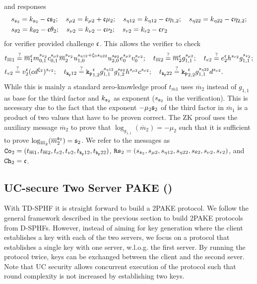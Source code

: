 and responses
\begin{align*}
  & s_{\mathfrak{s}_2} = k_{\mathfrak{s}_2} - \mathfrak{c}\mathfrak{s}_2; ~~~ s_{\mu2} = k_{\mu2} + \mathfrak{c}\mu_2; ~~~ s_{\eta12} = k_{\eta12} - \mathfrak{c}\eta_{1,2}; ~~~ s_{\eta22} = k_{\eta22} - \mathfrak{c}\eta_{2,2}; \\
  & s_{\theta2} = k_{\theta2} - \mathfrak{c}\theta_2; ~~~ s_{\nu2} = k_{\nu2} - \mathfrak{c}\nu_2; ~~~ s_{r2} = k_{r2} - \mathfrak{c} r_2
\end{align*}
for verifier provided challenge $\mathfrak{c}$.
This allows the verifier to check
\begin{align*}
  & t_{\overline{m}1} \stackrel{?}{=} \overline{m}_1^\mathfrak{c} m_{0,1}^{s_{\mathfrak{s}_2}} c_{0,1}^{s_{\mu2}} \overline{m}_{2}^{s_{\mathfrak{s}_2}} u_{1,0}^{s_{\eta12} + \xi_0 s_{\eta22}} u_{2,0}^{s_{\theta2}} e_0^{s_{\mu2}} v_0^{s_{\nu2}}; ~~~ 
    t_{\overline{m}2} \stackrel{?}{=} \overline{m}_2^\mathfrak{c} g_{1,1}^{s_{\mu2}}; ~~~  t_{e2} \stackrel{?}{=} e_2^\mathfrak{c} h^{s_{r2}}g_{1,1}^{s_{\mathfrak{s}_2}}; \\
  & t_{v2} \stackrel{?}{=} v_2^\mathfrak{c} (cd^{\xi_2})^{s_{r2}}; ~~~
    t_{\mathtt{k_p}12} \stackrel{?}{=} \mathtt{k_p}_{1,2}^\mathfrak{c} g_{1,1}^{s_{\eta12}} g_{1,2}^{s_{\theta2}} h^{s_{\mu2}} c^{s_{\nu2}}; ~~~ 
    t_{\mathtt{k_p}22} \stackrel{?}{=} \mathtt{k_p}_{2,2}^\mathfrak{c} g_{1,1}^{s_{\eta22}} d^{s_{\nu2}} .
\end{align*}
While this is mainly a standard zero-knowledge proof $t_{\overline{m}1}$ uses $\overline{m}_2$ instead of $g_{1,1}$ as base for the third factor and $k_{\mathfrak{s}_2}$ as exponent ($s_{\mathfrak{s}_2}$ in the verification).
This is necessary due to the fact that the exponent $-\mu_2 {\mathfrak{s}_2}$ of the third factor in $\overline{m}_1$ is a product of two values that have to be proven correct.
The \ac{ZK} proof uses the auxiliary message $\overline{m}_2$ to prove that $\log_{g_{1,1}}(\overline{m}_2)=-\mu_2$ such that it is sufficient to prove $\log_{\overline{m}_2}(\overline{m}_2^{{\mathfrak{s}_2}})={\mathfrak{s}_2}$.
We refer to the messages as $\mathtt{Co}_{2}=(t_{\overline{m}1}, t_{\overline{m}2}, t_{e2}, t_{v2}, t_{\mathtt{k_p}12}, t_{\mathtt{k_p}22})$, $\mathtt{Rs}_{2}=(s_{\mathfrak{s}_2}, s_{\mu2}, s_{\eta12}, s_{\eta22}, s_{\theta2}, s_{\nu2}, s_{r2})$, and $\mathtt{Ch}_{2}=\mathfrak{c}$.


\subsection{UC-secure Two Server PAKE (\FTWOPAKE)}\label{sec:2pake}
With \ac{TD-SPHF} it is straight forward to build a \ac{2PAKE} protocol.
We follow the general framework described in the previous section to build \ac{2PAKE} protocols from \acp{D-SPHF}.
However, instead of aiming for key generation where the client establishes a key with each of the two servers, we focus on a protocol that establishes a single key with one server, w.l.o.g. the first server.
By running the protocol twice, keys can be exchanged between the client and the second sever.
Note that \ac{UC} security allows concurrent execution of the protocol such that round complexity is not increased by establishing two keys.

